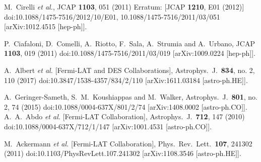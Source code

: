 \documentclass[12pt,prd,showpacs,amsmath,amssymb,aps,floats,floatfix,nofootinbib]{revtex4-1}
\begin{document}
\begin{thebibliography}{99}
  M.~Cirelli {\it et al.},
  JCAP {\bf 1103}, 051 (2011)
  Erratum: [JCAP {\bf 1210}, E01 (2012)]
  doi:10.1088/1475-7516/2012/10/E01, 10.1088/1475-7516/2011/03/051
  [arXiv:1012.4515 [hep-ph]].

  P.~Ciafaloni, D.~Comelli, A.~Riotto, F.~Sala, A.~Strumia and A.~Urbano,
  JCAP {\bf 1103}, 019 (2011)
  doi:10.1088/1475-7516/2011/03/019
  [arXiv:1009.0224 [hep-ph]].

  A.~Albert {\it et al.} [Fermi-LAT and DES Collaborations],
  Astrophys.\ J.\  {\bf 834}, no. 2, 110 (2017)
  doi:10.3847/1538-4357/834/2/110
  [arXiv:1611.03184 [astro-ph.HE]].

  A.~Geringer-Sameth, S.~M.~Koushiappas and M.~Walker,
  Astrophys.\ J.\  {\bf 801}, no. 2, 74 (2015)
  doi:10.1088/0004-637X/801/2/74
  [arXiv:1408.0002 [astro-ph.CO]].
  A.~A.~Abdo {\it et al.} [Fermi-LAT Collaboration],
  Astrophys.\ J.\  {\bf 712}, 147 (2010)
  doi:10.1088/0004-637X/712/1/147
  [arXiv:1001.4531 [astro-ph.CO]].

  M.~Ackermann {\it et al.} [Fermi-LAT Collaboration],
  Phys.\ Rev.\ Lett.\  {\bf 107}, 241302 (2011)
  doi:10.1103/PhysRevLett.107.241302
  [arXiv:1108.3546 [astro-ph.HE]].


\end{thebibliography}
\end{document}
